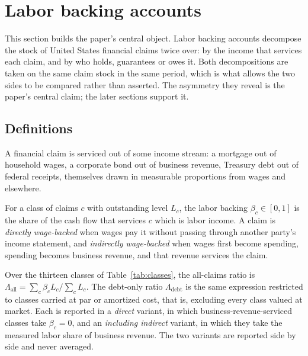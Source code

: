 \section{Labor backing accounts}
\label{sec:accounts}

This section builds the paper's central object. Labor backing accounts decompose the stock of
United States financial claims twice over: by the income that services each claim, and by who
holds, guarantees or owes it. Both decompositions are taken on the same claim stock in the same
period, which is what allows the two sides to be compared rather than asserted. The asymmetry they
reveal is the paper's central claim; the later sections support it.

\subsection{Definitions}

A financial claim is serviced out of some income stream: a mortgage out of household wages, a
corporate bond out of business revenue, Treasury debt out of federal receipts, themselves drawn in
measurable proportions from wages and elsewhere.

\begin{definition}
\label{def:backing}
For a class of claims $c$ with outstanding level $L_c$, the labor backing $\beta_c \in [0,1]$ is
the share of the cash flow that services $c$ which is labor income. A claim is
\emph{directly wage-backed} when wages pay it without passing through another party's income
statement, and \emph{indirectly wage-backed} when wages first become spending, spending becomes
business revenue, and that revenue services the claim.
\end{definition}

\begin{definition}
\label{def:ratio}
Over the thirteen classes of Table~\ref{tab:classes}, the all-claims ratio is
$\Lambda_{\mathrm{all}} = \sum_c \beta_c L_c / \sum_c L_c$. The debt-only ratio
$\Lambda_{\mathrm{debt}}$ is the same expression restricted to classes carried at par or
amortized cost, that is, excluding every class valued at market. Each is reported in a
\emph{direct} variant, in which business-revenue-serviced classes take $\beta_c = 0$, and an
\emph{including indirect} variant, in which they take the measured labor share of business
revenue. The two variants are reported side by side and never averaged.
\end{definition}

